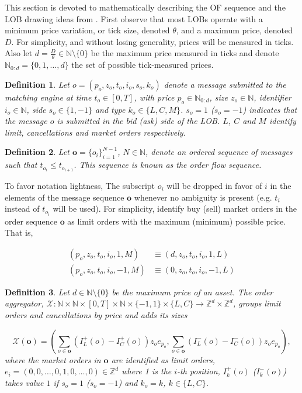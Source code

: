\documentclass[10pt,a4paper,oneside]{article}
\newcommand{\N}{\mathbb{N}}
\newcommand{\Z}{\mathbb{Z}}
\newtheorem{definition}{Definition}
\begin{document}
This section is devoted to mathematically describing the OF sequence and the LOB drawing ideas from \cite{cont2023mathematical, gould2013limit, panayi2015stochastic}. First observe that most LOBs operate with a minimum price variation, or tick size, denoted $\theta$, and a maximum price, denoted $D$. For simplicity, and without losing generality, prices will be measured in ticks. Also let $d = \frac{D}{\theta} \in \N \setminus \{ 0 \}$ be the maximum price measured in ticks and denote $\N_{0:d} = \{ 0, 1, \dots, d\}$ the set of possible tick-measured prices.

\begin{definition}
    Let $o = (p_o, z_o, t_o, i_o, s_o, k_o)$ denote a message submitted to the matching engine at time $t_o \in [0, T]$, with price $p_o \in \N_{0:d}$, size $z_o \in \N$, identifier $i_o \in \N$, side $s_o \in \{1, -1\}$ and type $k_o \in \{L, C, M \}$. $s_o = 1$ ($s_o = -1$) indicates that the message $o$ is submitted in the bid (ask) side of the LOB. $L$, $C$ and $M$ identify limit, cancellations and market orders respectively. 
    \label{def:order}
\end{definition}

\begin{definition}
    Let $\mathbf{o} = \{o_i\}^{N - 1}_{i = 1} $, $N \in \N$, denote an ordered sequence of messages such that $t_{o_i} \leq t_{o_{i + 1}}$. This sequence is known as the order flow sequence.
\label{def:order_seq}
\end{definition}

To favor notation lightness, The subscript $o_i$ will be dropped in favor of $i$ in the elements of the message sequence $\mathbf{o}$ whenever no ambiguity is present (e.g. $t_i$ instead of $t_{o_i}$ will be used). For simplicity, identify buy (sell) market orders in the order sequence $\mathbf{o}$ as limit orders with the maximum (minimum) possible price. That is, 

\begin{align*}
    (p_o, z_o, t_o, i_o, 1,  M) &\equiv (d, z_o, t_o, i_o, 1, L) \\
    (p_o, z_o, t_o, i_o, -1, M) &\equiv (0, z_o, t_o, i_o, -1, L)
\end{align*}


\begin{definition}
Let $d \in \N \setminus \{ 0 \}$ be the maximum price of an asset. The order aggregator, $\mathcal{X} : \N \times \N \times [0, T] \times \N \times \{-1, 1 \} \times \{ L, C\} \rightarrow \Z^d \times \Z^d$, groups limit orders and cancellations by price and adds its sizes
    
$$
\mathcal{X}(\mathbf{o}) = \left( \sum_{o \in \mathbf{o}} (I^+_L(o) - I^+_C(o)) z_o e_{p_o}, \sum_{o \in \mathbf{o}} (I^-_L(o) - I^-_C(o)) z_o e_{p_o} \right),
$$
where the market orders in $\mathbf{o}$ are identified as limit orders, $e_i = (0, 0, \dots, 0, 1, 0, \dots, 0) \in \Z^d$ where 1 is the $i$-th position, $I^+_k(o)$ ($I^-_k(o)$) takes value $1$ if $s_o = 1$ ($s_o = -1$) and $k_o = k$, $k \in \{ L, C\}$.
\label{def:order_aggregator}
\end{definition}
\end{document}
